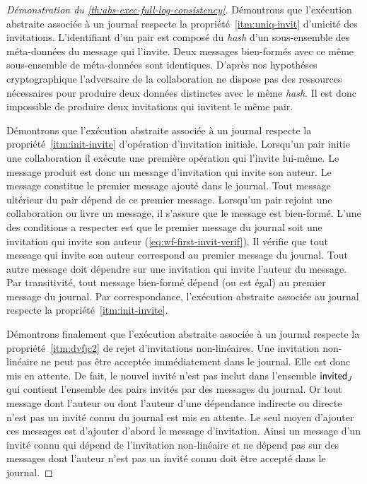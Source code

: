 \begin{proof}[Démonstration du \autoref{th:abs-exec-full-log-consistency}]
Démontrons que l'exécution abstraite associée à un journal  respecte la propriété~\ref{itm:uniq-invit} d'unicité des invitations.
L'identifiant d'un pair est composé du \emph{hash} d'un sous-ensemble des méta-données du message qui l'invite.
Deux messages bien-formés avec ce même sous-ensemble de méta-données sont identiques.
D'après nos hypothéses cryptographique l'adversaire de la collaboration ne dispose pas des ressources nécessaires pour produire deux données distinctes avec le même \emph{hash}.
Il est donc impossible de produire deux invitations qui invitent le même pair.

Démontrons que l'exécution abstraite associée à un journal respecte la propriété~\ref{itm:init-invite} d'opération d'invitation initiale.
Lorsqu'un pair initie une collaboration il exécute une première opération qui l'invite lui-même.
Le message produit est donc un message d'invitation qui invite son auteur.
Le message constitue le premier message ajouté dans le journal.
Tout message ultérieur du pair dépend de ce premier message.
Lorsqu'un pair rejoint une collaboration ou livre un message, il s'assure que le message est bien-formé.
L'une des conditions a respecter est que le premier message du journal soit une invitation qui invite son auteur (\autoref{eq:wf-first-invit-verif}).
Il vérifie que tout message qui invite son auteur correspond au premier message du journal.
Tout autre message doit dépendre sur une invitation qui invite l'auteur du message.
Par transitivité, tout message bien-formé dépend (ou est égal) au premier message du journal.
Par correspondance, l'exécution abstraite associée au journal respecte la propriété~\ref{itm:init-invite}.

Démontrons finalement que l'exécution abstraite associée à un journal respecte la propriété~\ref{itm:dvfjc2} de rejet d'invitations non-linéaires.
Une invitation non-linéaire ne peut pas être acceptée immédiatement dans le journal.
Elle est donc mis en attente.
De fait, le nouvel invité n'est pas inclut dans l'ensemble $\operatorname{\mathsf{invited}}_J$ qui contient l'ensemble des pairs invités par des messages du journal.
Or tout message dont l'auteur ou dont l'auteur d'une dépendance indirecte ou directe n'est pas un invité connu du journal est mis en attente.
Le seul moyen d'ajouter ces messages est d'ajouter d'abord le message d'invitation.
Ainsi un message d'un invité connu qui dépend de l'invitation non-linéaire et ne dépend pas sur des messages dont l'auteur n'est pas un invité connu doit être accepté dans le journal.
\end{proof}


